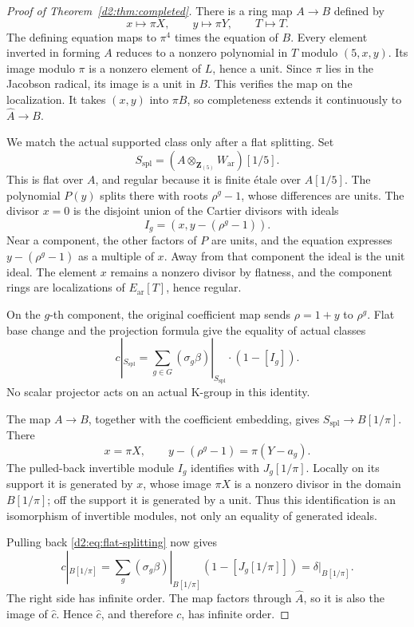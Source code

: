 \documentclass[11pt,a4paper]{amsart}
\numberwithin{equation}{section}
\theoremstyle{definition}
\theoremstyle{remark}
\newcommand{\DtwoZZ}{\mathbf{Z}}
\newcommand{\Dtwowh}{\widehat}
\newcommand{\Dtwoar}{\mathrm{ar}}
\begin{document}
\begin{proof}[Proof of Theorem~\ref{d2:thm:completed}]
There is a ring map \(A\to B\) defined by
\[
 x\longmapsto\pi X,\qquad y\longmapsto\pi Y,
 \qquad T\longmapsto T.
\]
The defining equation maps to \(\pi^4\) times the equation of \(B\).
Every element inverted in forming \(A\) reduces to a nonzero
polynomial in \(T\) modulo \((5,x,y)\).
Its image modulo \(\pi\) is a nonzero element of \(L\), hence a
unit. Since \(\pi\) lies in the Jacobson radical, its image is
a unit in \(B\).
This verifies the map on the localization.
It takes \((x,y)\) into \(\pi B\), so completeness extends it
continuously to \(\Dtwowh A\to B\).

We match the actual supported class only after a flat splitting.
Set
\[
 S_{\mathrm{spl}}=
 (A\otimes_{\DtwoZZ_{(5)}}W_{\Dtwoar})[1/5].
\]
This is flat over \(A\), and regular because it is finite \'etale
over \(A[1/5]\).
The polynomial \(P(y)\) splits there with roots \(\rho^g-1\),
whose differences are units.
The divisor \(x=0\) is the disjoint union of the Cartier divisors
with ideals
\[
 I_g=(x,y-(\rho^g-1)).
\]
Near a component, the other factors of \(P\) are units, and the
equation expresses \(y-(\rho^g-1)\) as a multiple of \(x\).
Away from that component the ideal is the unit ideal.
The element \(x\) remains a nonzero divisor by flatness, and the
component rings are localizations of \(E_{\Dtwoar}[T]\), hence regular.

On the \(g\)-th component, the original coefficient map sends
\(\rho=1+y\) to \(\rho^g\).
Flat base change and the projection formula give the equality of
actual classes
\begin{equation}\label{d2:eq:flat-splitting}
 c|_{S_{\mathrm{spl}}}
   =\sum_{g\in G}(\sigma_g\beta)|_{S_{\mathrm{spl}}}
                         \cdot(1-[I_g]).
\end{equation}
No scalar projector acts on an actual K-group in this identity.

The map \(A\to B\), together with the coefficient embedding,
gives \(S_{\mathrm{spl}}\to B[1/\pi]\).
There
\[
 x=\pi X,\qquad
 y-(\rho^g-1)=\pi(Y-a_g).
\]
The pulled-back invertible module \(I_g\) identifies with
\(J_g[1/\pi]\).
Locally on its support it is generated by \(x\), whose image
\(\pi X\) is a nonzero divisor in the domain \(B[1/\pi]\);
off the support it is generated by a unit.
Thus this identification is an isomorphism of invertible modules,
not only an equality of generated ideals.

Pulling back \eqref{d2:eq:flat-splitting} now gives
\[
 c|_{B[1/\pi]}
 =\sum_g(\sigma_g\beta)|_{B[1/\pi]}
                          (1-[J_g[1/\pi]])
 =\delta|_{B[1/\pi]}.
\]
The right side has infinite order.
The map factors through \(\Dtwowh A\), so it is also the image of
\(\Dtwowh c\). Hence \(\Dtwowh c\), and therefore \(c\), has infinite order.


\end{proof}
\end{document}
